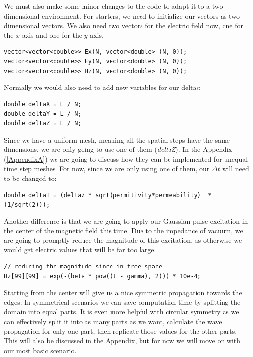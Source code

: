 We must also make some minor changes to the code to adapt it to a two-dimensional environment. For starters, we need to initialize our vectors as two-dimensional vectors. We also need two vectors for the electric field now, one for the $x$ axis and one for the $y$ axis.

\begin{verbatim}
vector<vector<double>> Ex(N, vector<double> (N, 0));
vector<vector<double>> Ey(N, vector<double> (N, 0));
vector<vector<double>> Hz(N, vector<double> (N, 0));
\end{verbatim}

Normally we would also need to add new variables for our deltas:
\begin{verbatim}
double deltaX = L / N;
double deltaY = L / N;
double deltaZ = L / N;
\end{verbatim}

Since we have a uniform mesh, meaning all the spatial steps have the same dimensions, we are only going to use one of them (\textit{deltaZ}). In the Appendix (\ref{AppendixA}) we are going to discuss how they can be implemented for unequal time step meshes. For now, since we are only using one of them, our $\Delta t$ will need to be changed to:

\begin{verbatim}
double deltaT = (deltaZ * sqrt(permitivity*permeability)  * (1/sqrt(2)));
\end{verbatim}

Another difference is that we are going to apply our Gaussian pulse excitation in the center of the magnetic field this time. Due to the impedance of vacuum, we are going to promptly reduce the magnitude of this excitation, as otherwise we would get electric values that will be far too large.

\begin{verbatim}
// reducing the magnitude since in free space
Hz[99][99] = exp(-(beta * pow((t - gamma), 2))) * 10e-4;
\end{verbatim}

Starting from the center will give us a nice symmetric propagation towards the edges. In symmetrical scenarios we can save computation time by splitting the domain into equal parts. It is even more helpful with circular symmetry as we can effectively split it into as many parts as we want, calculate the wave propagation for only one part, then replicate those values for the other parts. This will also be discussed in the Appendix, but for now we will move on with our most basic scenario.

